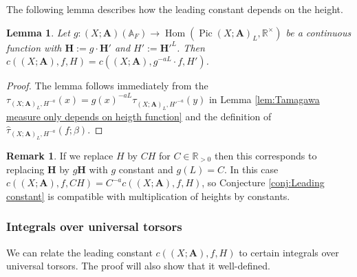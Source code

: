 \documentclass[a4paper,11pt,reqno]{amsart}
\newcommand{\R}{\mathbb{R}}
\newcommand{\A}{\mathbb{A}}
\DeclareMathOperator{\Hom}{Hom}
\DeclareMathOperator{\Pic}{Pic}
\newtheorem{lemma}[theorem]{Lemma}
\theoremstyle{definition}
\newtheorem{remark}[theorem]{Remark}
\begin{document}
The following lemma describes how the leading constant depends on the height.
\begin{lemma}\label{lem:Compatibility of heights}
	Let $g: (X ; \mathbf{A})(\A_F) \to \Hom(\Pic (X; \mathbf{A})_L, \R^{\times})$ be a continuous function with $\mathbf{H} := g \cdot \mathbf{H}'$ and $H' := \mathbf{H}'^{L}$. Then $c((X ; \mathbf{A}), f, H) = c((X ; \mathbf{A}), g^{-aL} \cdot f, H')$.
\end{lemma}
\begin{proof}
	The lemma follows immediately from  the $\tau_{(X ; \mathbf{A})_L, H^{-a}}(x) = g(x)^{- aL} \tau_{(X ; \mathbf{A})_L, H'^{-a}}(y)$ in Lemma \ref{lem:Tamagawa measure only depends on heigth function} and the definition of $\hat{\tau}_{(X; \mathbf{A})_L, H^{-a}}(f ; \beta)$.
\end{proof}
\begin{remark}\label{rem:Remarks on changing heights}
	If we replace $H$ by $C H$ for $C \in \R_{> 0}$ then this corresponds to replacing $\mathbf{H}$ by $g \mathbf{H}$ with $g$ constant and $g(L) = C$. In this case $c((X ; \mathbf{A}), f, C H) = C^{- a}c((X ; \mathbf{A}), f, H)$, so Conjecture \ref{conj:Leading constant} is compatible with multiplication of heights by constants.
\end{remark}

\subsubsection{Integrals over universal torsors}
We can relate the leading constant $c((X; \mathbf{A}), f, H)$ to certain integrals over universal torsors. The proof will also show that it well-defined. 
\end{document}
